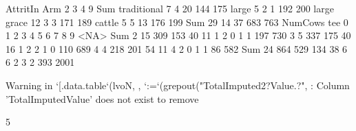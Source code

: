 \begin{Schunk}
\begin{Soutput}
             AttritIn
Arm             2   3   4   9 Sum
  traditional   7   4  20 144 175
  large         5   2   1 192 200
  large grace  12   3   3 171 189
  cattle        5   5  13 176 199
  Sum          29  14  37 683 763
     NumCows
tee      0    1    2    3    4    5    6    7    8    9 <NA>  Sum
  2     15  309  153   40   11    1    2    0    1    1  197  730
  3      5  337  175   40   16    1    2    2    1    0  110  689
  4      4  218  201   54   11    4    2    0    1    1   86  582
  Sum   24  864  529  134   38    6    6    2    3    2  393 2001
\end{Soutput}
\end{Schunk}
\begin{Schunk}
\begin{Soutput}
Warning in `[.data.table`(lvoN, , `:=`(grepout("TotalImputed2?Value.?", : Column 'TotalImputedValue' does not exist to remove
\end{Soutput}
\end{Schunk}
\begin{Schunk}
\begin{Soutput}
[1] 5
\end{Soutput}
\end{Schunk}


